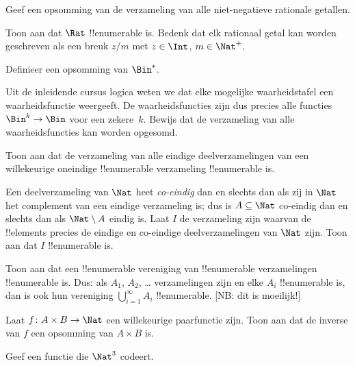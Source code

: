 \documentclass[../../../include/open-logic-section]{subfiles}
\begin{document}
\begin{prob}
Geef een opsomming van de verzameling van alle niet-negatieve rationale
getallen.
\end{prob}

\begin{prob}
Toon aan dat $\Rat$ !!{enumerable} is. Bedenk dat elk rationaal getal
kan worden geschreven als een breuk $z/m$ met $z \in \Int$, $m \in \Nat^+$.
\end{prob}

\begin{prob}
Definieer een opsomming van $\Bin^*$.
\end{prob}

\begin{prob}
Uit de inleidende cursus logica weten we dat elke mogelijke waarheidstafel een
waarheidsfunctie weergeeft. De waarheidsfuncties zijn dus precies alle functies
$\Bin^k \to \Bin$ voor een zekere~$k$. Bewijs dat de verzameling van alle
waarheidsfuncties kan worden opgesomd.
\end{prob}

\begin{prob}
Toon aan dat de verzameling van alle eindige deelverzamelingen van een
willekeurige oneindige !!{enumerable} verzameling !!{enumerable} is.
\end{prob}

\begin{prob}
Een deelverzameling van $\Nat$ heet \emph{co-eindig} dan en slechts dan
als zij in $\Nat$ het complement van een eindige verzameling is; dus
is $A \subseteq \Nat$ co-eindig dan en slechts dan als
$\Nat\setminus A$ eindig is. Laat $I$ de verzameling zijn waarvan de
!!{element}s precies de eindige en co-eindige deelverzamelingen van
$\Nat$ zijn. Toon aan dat $I$ !!{enumerable} is.
\end{prob}

\begin{prob}
Toon aan dat een !!{enumerable} vereniging van !!{enumerable}
verzamelingen !!{enumerable} is. Dus: als $A_1$, $A_2$, \dots{}
verzamelingen zijn en elke $A_i$ !!{enumerable} is, dan is ook hun
vereniging $\bigcup_{i=1}^\infty A_i$ !!{enumerable}. [NB: dit is
moeilijk!]
\end{prob}

\begin{prob}
Laat $f \colon A \times B \to \Nat$ een willekeurige paarfunctie zijn.
Toon aan dat de inverse van $f$ een opsomming van $A \times B$ is.
\end{prob}

\begin{prob}
Geef een functie die $\Nat^3$ codeert.
\end{prob}
\end{document}
